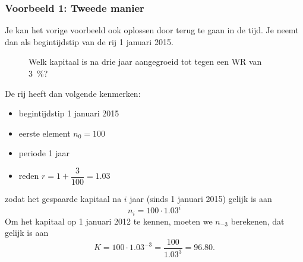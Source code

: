\subsubsection{Voorbeeld 1: Tweede manier}
\label{vb1:2demanier}
Je kan  het vorige voorbeeld ook oplossen door terug te gaan in de tijd. Je neemt dan als begintijdstip van de rij 1 januari 2015. 
\begin{figure}[htbp]
    \centering
{}
    \caption{Welk kapitaal is na drie jaar aangegroeid tot  tegen een WR van \SI{3}{\percent}?}
    \label{fig:oef1terugtellen} 
\end{figure}
De rij heeft dan volgende kenmerken:
\begin{itemize}
\item begintijdstip 1 januari 2015
\item eerste element $n_0=100$
\item periode 1 jaar
\item reden $r=1+\dfrac{3}{100}=\num{1.03}$
\end{itemize}
zodat het gespaarde kapitaal na $i$ jaar (sinds 1 januari 2015) gelijk is aan 
\begin{equation}
n_i=100\cdot \num{1.03}^i
\end{equation}
Om het kapitaal op 1 januari 2012 te kennen, moeten we $n_{-3}$ berekenen, dat gelijk is aan 
\[
K=100\cdot \num{1.03}^{-3}=\frac{100}{\num{1.03}^{3}}=\num{96,80}.
\]


